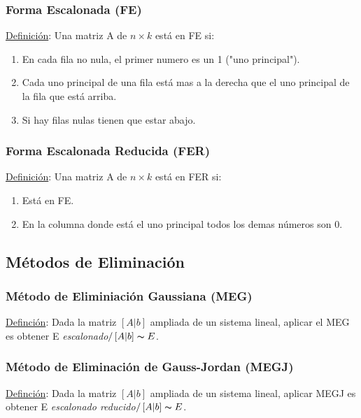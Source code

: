 \documentclass{article}
\newcommand{\tq}{/\,}                                   %
\begin{document}
\subsubsection*{Forma Escalonada (FE)}
\underline{Definición}: Una matriz A de $n \times k$ está en FE si:
\begin{enumerate}
    \item En cada fila no nula, el primer numero es un 1 ("uno principal").
    \item Cada uno principal de una fila está mas a la derecha que el uno principal de la fila que está arriba.
    \item Si hay filas nulas tienen que estar abajo.
\end{enumerate}
\subsubsection*{Forma Escalonada Reducida (FER)}
\underline{Definición}: Una matriz A de $n \times k$ está en FER si:
\begin{enumerate}
    \item Está en FE.
    \item En la columna donde está el uno principal todos los demas números son 0.
\end{enumerate}

\subsection{Métodos de Eliminación}
\subsubsection*{Método de Eliminiación Gaussiana (MEG)}
\underline{Definción}: Dada la matriz $[A|b]$ ampliada de un sistema lineal, aplicar el MEG es obtener E \emph{escalonado}$\tq [A|b] \thicksim E$.
\subsubsection*{Método de Eliminación de Gauss-Jordan (MEGJ)}
\underline{Definción}: Dada la matriz $[A|b]$ ampliada de un sistema lineal, aplicar MEGJ es obtener E \emph{escalonado reducido}$\tq [A|b] \thicksim E$.
\end{document}
